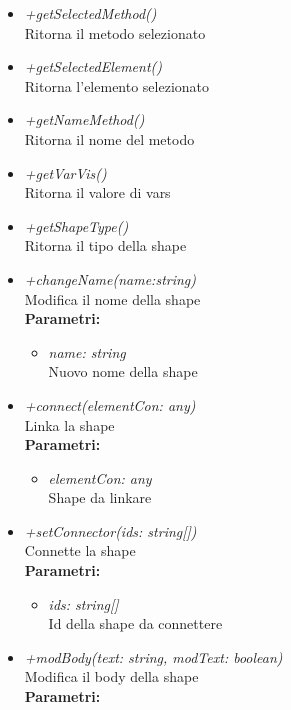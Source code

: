 \begin{itemize}
\begin{itemize}
\begin{itemize}
    		\end{itemize}
    		\item \emph{+getSelectedMethod()}\\
    		Ritorna il metodo selezionato
    		\item \emph{+getSelectedElement()}\\
    		Ritorna l'elemento selezionato
    		\item \emph{+getNameMethod()}\\
    		Ritorna il nome del metodo
    		\item \emph{+getVarVis()}\\
    		Ritorna il valore di vars
    		\item \emph{+getShapeType()}\\
    		Ritorna il tipo della shape
    		\item \emph{+changeName(name:string)}\\
    		Modifica il nome della shape\\
    		\textbf{Parametri:}
    		\begin{itemize}
    			\item \emph{name: string}\\
    			Nuovo nome della shape
    		\end{itemize}
    		\item \emph{+connect(elementCon: any)}\\
    		Linka la shape\\
    		\textbf{Parametri:}
    		\begin{itemize}
    			\item \emph{elementCon: any}\\
    			Shape da linkare
    		\end{itemize}
    		\item \emph{+setConnector(ids: string[])}\\
    		Connette la shape\\
    		\textbf{Parametri:}
    		\begin{itemize}
    			\item \emph{ids: string[]}\\
    			Id della shape da connettere
    		\end{itemize}
    		\item \emph{+modBody(text: string, modText: boolean)}\\
    		Modifica il body della shape\\
    		\textbf{Parametri:}
    		\begin{itemize}

\end{itemize}
\end{itemize}
\end{itemize}
